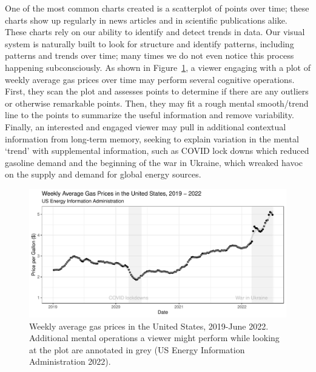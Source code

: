 \documentclass[
]{jds}
\begin{document}
One of the most common charts created is a scatterplot of points over
time; these charts show up regularly in news articles and in scientific
publications alike. These charts rely on our ability to identify and
detect trends in data. Our visual system is naturally built to look for
structure and identify patterns, including patterns and trends over
time; many times we do not even notice this process happening
subconsciously. As shown in Figure~\ref{fig-gas-prices}, a viewer
engaging with a plot of weekly average gas prices over time may perform
several cognitive operations. First, they scan the plot and assesses
points to determine if there are any outliers or otherwise remarkable
points. Then, they may fit a rough mental smooth/trend line to the
points to summarize the useful information and remove variability.
Finally, an interested and engaged viewer may pull in additional
contextual information from long-term memory, seeking to explain
variation in the mental `trend' with supplemental information, such as
COVID lock downs which reduced gasoline demand and the beginning of the
war in Ukraine, which wreaked havoc on the supply and demand for global
energy sources.

\begin{figure}

{\centering \includegraphics{./images/fig-gas-prices-1.pdf}

}

\caption{\label{fig-gas-prices}Weekly average gas prices in the United
States, 2019-June 2022. Additional mental operations a viewer might
perform while looking at the plot are annotated in grey (US Energy
Information Administration 2022).}

\end{figure}
\end{document}
